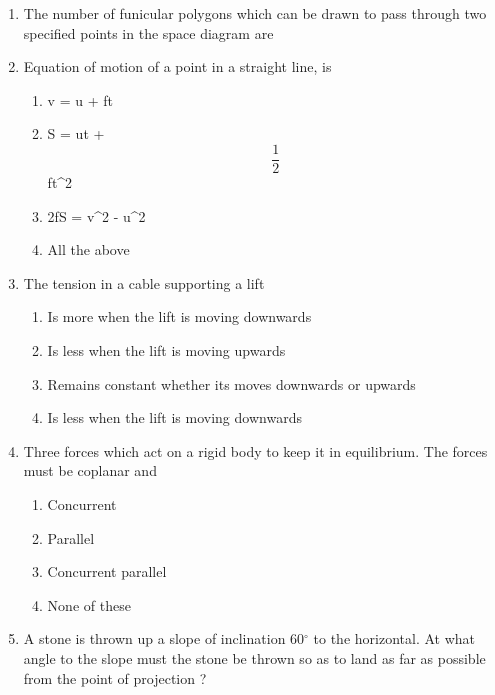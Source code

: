 \documentclass[11pt,a4paper]{article}
\begin{document}
\begin{enumerate}
\item{The number of funicular polygons which can be drawn to pass through two specified points in the space diagram are}
\\
\item{Equation of motion of a point in a straight line, is}
\begin{enumerate}[label=\Alph*.]
\item{v = u + ft}
\item{S = ut + $$\frac{1}{2}$$ ft\^{}2}
\item{2fS = v\^{}2 - u\^{}2}
\item{All the above}
\end{enumerate}
\item{The tension in a cable supporting a lift}
\begin{enumerate}[label=\Alph*.]
\item{Is more when the lift is moving downwards}
\item{Is less when the lift is moving upwards}
\item{Remains constant whether its moves downwards or upwards}
\item{Is less when the lift is moving downwards}
\end{enumerate}
\item{Three forces which act on a rigid body to keep it in equilibrium. The forces must be coplanar and}
\begin{enumerate}[label=\Alph*.]
\item{Concurrent}
\item{Parallel}
\item{Concurrent parallel}
\item{None of these}
\end{enumerate}
\item{A stone is thrown up a slope of inclination 60$^\circ$ to the horizontal. At what angle to the slope must the stone be thrown so as to land as far as possible from the point of projection ?
}
\end{enumerate}
\end{document}
